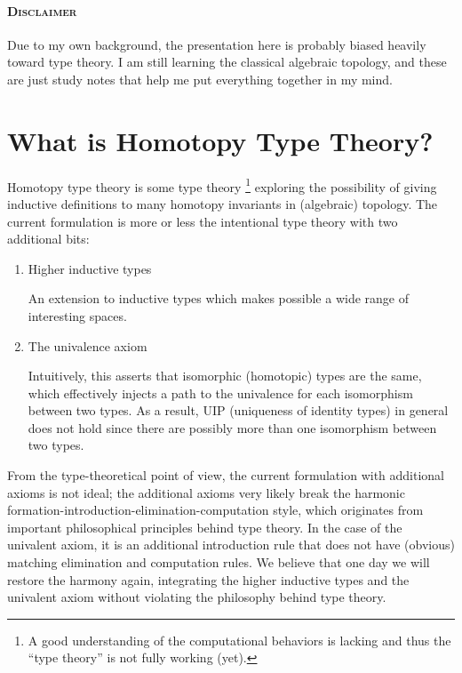 \documentclass{article}
\begin{document}
\newcommand{\path}{\mathbin{=}}
\newcommand{\trunc}[2]{\| #2 \|_{#1}}
\newcommand{\proj}[2]{| #2 |_{#1}}
\newcommand{\fpbox}[1]{\fbox{\pbox[t]{\textwidth}{#1}}}
\newcommand{\suc}{\mathtt{suc}}
\newcommand{\TODO}[1]{\textcolor{Olive}{\fbox{\textsc{todo}} {#1}}}

\begin{mdframed}
  \paragraph{\textsc{Disclaimer}}
  Due to my own background, the presentation here is probably biased heavily toward type theory.
  I am still learning the classical algebraic topology, and these are just study notes that
  help me put everything together in my mind.
\end{mdframed}

\section{What is Homotopy Type Theory?}

Homotopy type theory is some type theory%
\footnote{A good understanding of the computational behaviors
  is lacking and thus the ``type theory'' is not fully working (yet).}
exploring the possibility of
giving inductive definitions to many homotopy invariants in (algebraic) topology.
The current formulation is more or less the intentional type theory
with two additional bits:
\begin{enumerate}
  \item Higher inductive types

    An extension to inductive types which makes possible
    a wide range of interesting spaces.

  \item The univalence axiom

    Intuitively, this asserts that isomorphic (homotopic) types are the same,
    which effectively injects a path to the univalence
    for each isomorphism between two types.
    As a result, UIP (uniqueness of identity types) in general
    does not hold since there are possibly more than one isomorphism
    between two types.
\end{enumerate}

From the type-theoretical point of view,
the current formulation with additional axioms is not ideal;
the additional axioms very likely break the harmonic
formation-introduction-elimination-computation style,
which originates from important philosophical principles behind type theory.
In the case of the univalent axiom,
it is an additional introduction rule
that does not have (obvious) matching elimination and computation rules.
We believe that one day we will restore the harmony again,
integrating the higher inductive types and the univalent axiom
without violating the philosophy behind type theory.
\end{document}
